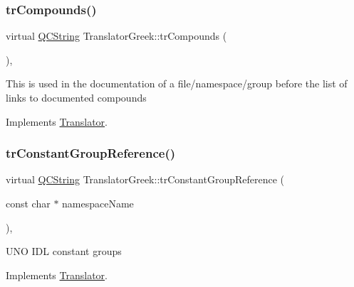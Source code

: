 \mbox{\label{class_translator_greek_a086a20bfe04ebf6416da1c170b12defb}} 
\subsubsection{\texorpdfstring{trCompounds()}{trCompounds()}}
{\footnotesize\ttfamily virtual \mbox{\hyperlink{class_q_c_string}{Q\+C\+String}} Translator\+Greek\+::tr\+Compounds (\begin{DoxyParamCaption}{ }\end{DoxyParamCaption})\hspace{0.3cm}{\ttfamily [inline]}, {\ttfamily [virtual]}}

This is used in the documentation of a file/namespace/group before the list of links to documented compounds 

Implements \mbox{\hyperlink{class_translator}{Translator}}.

\mbox{\label{class_translator_greek_a36e0dcd5eba7efc3937dc31919b3333f}} 
\subsubsection{\texorpdfstring{trConstantGroupReference()}{trConstantGroupReference()}}
{\footnotesize\ttfamily virtual \mbox{\hyperlink{class_q_c_string}{Q\+C\+String}} Translator\+Greek\+::tr\+Constant\+Group\+Reference (\begin{DoxyParamCaption}\item[{const char $\ast$}]{namespace\+Name }\end{DoxyParamCaption})\hspace{0.3cm}{\ttfamily [inline]}, {\ttfamily [virtual]}}

U\+NO I\+DL constant groups 

Implements \mbox{\hyperlink{class_translator}{Translator}}.

\mbox{\label{class_translator_greek_a3e20decab3dc1713ff5eefd2363aa671}} 

